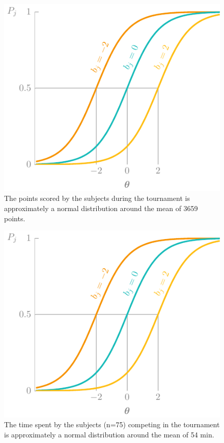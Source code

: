 \begin{figure}
    \centering
  \includegraphics[page=17]{03-education/figures/tikzfigures.pdf}
  \caption[Histogram of points scored in the \gls{scw} tournament]{The points scored by the subjects during the tournament is approximately a normal distribution around the mean of 3659 points.}
  \label{fig:hist-score} 
\end{figure}

\begin{figure}
    \centering
  \includegraphics[page=18]{03-education/figures/tikzfigures.pdf}
  \caption[Histogram of time spent in the \gls{scw} tournament]{The time spent by the subjects (n=75) competing in the tournament is approximately a normal distribution around the mean of 54 min.}
  \label{fig:hist-time} 
\end{figure}



